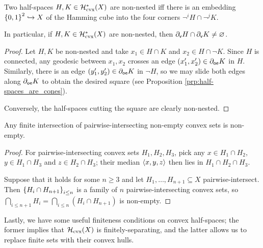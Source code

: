 \documentclass[reqno]{amsart}
\begin{document}
    \begin{corollary}\label{cor:non-nested_iff_embedding_of_hamming}
        Two half-spaces $H,K\in\mathcal{H}_\mathrm{cvx}^\ast(X)$ are non-nested iff there is an embedding $\left\{0,1\right\}^2\hookrightarrow X$ of the Hamming cube into the four corners $\lnot^iH\cap\lnot^jK$.

        In particular, if $H,K\in\mathcal{H}_\mathrm{cvx}^\ast(X)$ are non-nested, then $\partial_\mathsf{v}H\cap\partial_\mathsf{v}K\neq\varnothing$.
    \end{corollary}
    \begin{proof}
        Let $H,K$ be non-nested and take $x_1\in H\cap K$ and $x_2\in H\cap\lnot K$. Since $H$ is connected, any geodesic between $x_1,x_2$ crosses an edge $(x_1',x_2')\in\partial_\mathsf{oe}K$ in $H$. Similarly, there is an edge $(y_1',y_2')\in\partial_\mathsf{oe}K$ in $\lnot H$, so we may slide both edges along $\partial_\mathsf{oe}K$ to obtain the desired square (see Proposition \ref{prp:half-spaces_are_cones}).

        Conversely, the half-spaces cutting the square are clearly non-nested.
    \end{proof}

    \begin{lemma}[Helly]\label{lem:helly}
        Any finite intersection of pairwise-intersecting non-empty convex sets is non-empty.
    \end{lemma}
    \begin{proof}
        For pairwise-intersecting convex sets $H_1,H_2,H_3$, pick any $x\in H_1\cap H_2$, $y\in H_1\cap H_3$ and $z\in H_2\cap H_3$; their median $\left\langle x,y,z\right\rangle$ then lies in $H_1\cap H_2\cap H_3$.

        Suppose that it holds for some $n\geq 3$ and let $H_1,\dots,H_{n+1}\subseteq X$ pairwise-intersect. Then $\left\{H_i\cap H_{n+1}\right\}_{i\leq n}$ is a family of $n$ pairwise-intersecting convex sets, so $\bigcap_{i\leq n+1}H_i=\bigcap_{i\leq n}(H_i\cap H_{n+1})$ is non-empty.
    \end{proof}

    Lastly, we have some useful finiteness conditions on convex half-spaces; the former implies that $\mathcal{H}_\mathrm{cvx}(X)$ is finitely-separating, and the latter allows us to replace finite sets with their convex hulls.
\end{document}

